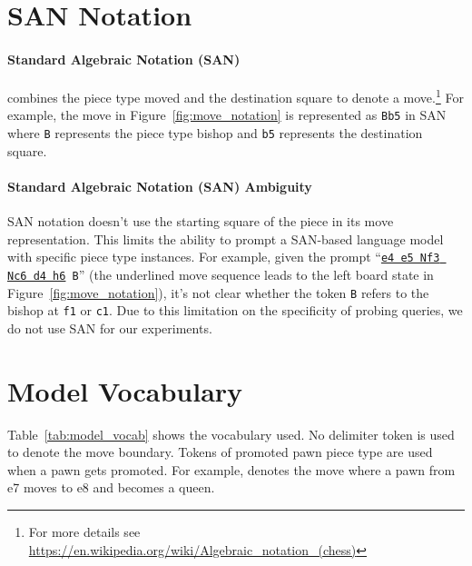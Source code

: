 \newpage


\section{SAN Notation}
\label{sec:san}
\paragraph{Standard Algebraic Notation (SAN)} combines the piece type moved and the destination square to denote a move.\footnote{For more details see \url{https://en.wikipedia.org/wiki/Algebraic_notation_(chess)}}
For example, the move in Figure~\ref{fig:move_notation} is represented as \texttt{Bb5} in SAN where \texttt{B} represents the piece type bishop and \texttt{b5} represents the destination square.

\paragraph{Standard Algebraic Notation (SAN) Ambiguity}
SAN notation doesn't use the starting square of the piece in its move representation.
This limits the ability to prompt a SAN-based language model with specific piece type instances.
For example, given the prompt ``\texttt{\underline{e4 e5 Nf3 Nc6 d4 h6} B}'' (the underlined move sequence leads to the left board state in Figure~\ref{fig:move_notation}), it's not clear whether the token \texttt{B} refers to the bishop at \texttt{f1} or \texttt{c1}. Due to this limitation on the specificity of probing queries, we do not use SAN for our experiments.

\section{Model Vocabulary}

Table~\ref{tab:model_vocab} shows the vocabulary used. 
No delimiter token is used to denote the move boundary. 
Tokens of promoted pawn piece type are used when a pawn gets promoted.
For example,  denotes the move where a pawn from e7 moves to e8 and becomes a queen.









